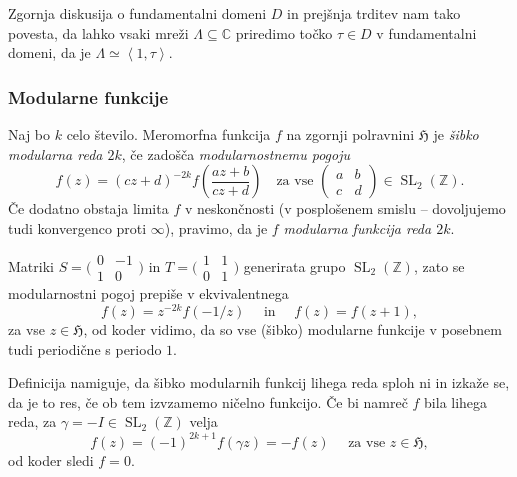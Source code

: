 \documentclass[mat1]{fmfdelo}
\numberwithin{equation}{section}
\newcommand{\Z}{\mathbb Z}
\newcommand{\C}{\mathbb C}
\newcommand{\HH}{\mathfrak{H}}
\newcommand{\SL}{\Gamma}
\newcommand{\pabcd}{\begin{pmatrix} a & b \\ c & d \end{pmatrix}}
\newcommand{\htp}{\simeq}
\newcommand{\lattice}[2]{\left\langle #1, #2 \right\rangle}
\newcommand{\ti}{t.~i.\ }
\theoremstyle{definition}
\begin{document}
Zgornja diskusija o fundamentalni domeni $D$ in prejšnja trditev nam tako povesta, da lahko vsaki mreži $\Lambda \subseteq \C$ priredimo točko $\tau \in D$ v fundamentalni domeni, da je $\Lambda \htp \lattice{1}{\tau}$.

\subsubsection{Modularne funkcije}

\begin{definicija}
    Naj bo $k$ celo število. Meromorfna funkcija $f$ na zgornji polravnini $\HH$ je \emph{šibko modularna reda $2k$}, če zadošča \emph{modularnostnemu pogoju}
    \begin{equation}
        \label{eq: modularnostni pogoj}
        f(z) = (cz + d)^{-2k} f\left(\frac{az + b}{cz + d}\right) \quad \text{za vse } \pabcd \in \operatorname{SL}_2(\Z).
    \end{equation}
    Če dodatno obstaja limita $f$ v neskončnosti (v posplošenem smislu -- dovoljujemo tudi konvergenco proti $\infty$), pravimo, da je $f$ \emph{modularna funkcija reda $2k$}. 
\end{definicija}

\begin{opomba}
    Matriki $S = \big(\begin{smallmatrix} 0 & -1\\1 & 0 \end{smallmatrix}\big)$ in $T = \big(\begin{smallmatrix} 1 & 1\\0 & 1 \end{smallmatrix}\big)$ generirata grupo $\operatorname{SL}_2(\Z)$, zato se modularnostni pogoj prepiše v ekvivalentnega
    \[
        f(z) = z^{-2k}f\left(-1/z\right) \quad \text{ in } \quad f(z) = f(z + 1),
    \] 
    za vse $z \in \HH$, od koder vidimo, da so vse (šibko) modularne funkcije v posebnem tudi periodične s periodo $1$.
\end{opomba}

\begin{opomba}
    Definicija namiguje, da šibko modularnih funkcij lihega reda sploh ni in izkaže se, da je to res, če ob tem izvzamemo ničelno funkcijo. Če bi namreč $f$ bila lihega reda, za $\gamma = -I \in \operatorname{SL}_2(\Z)$ velja
    \[
        f(z) = (-1)^{2k+1}f(\gamma z) = -f(z) \quad \text{ za vse } z \in \HH,
    \]
    od koder sledi $f=0$.
\end{opomba}
\end{document}
